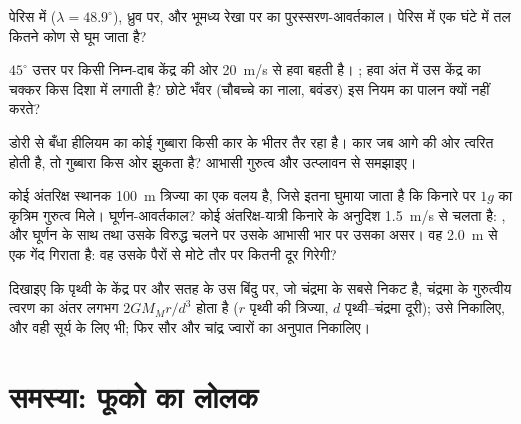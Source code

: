 \begin{exercise}[$\star\star$]\label{exo:b1:non-inertial-frames:8}
पेरिस में ($\lambda = 48.9^\circ$), ध्रुव पर, और भूमध्य रेखा पर 
का पुरस्सरण-आवर्तकाल। पेरिस में एक घंटे में तल कितने कोण से घूम जाता है?
\end{exercise}

\begin{exercise}[$\star\star$]\label{exo:b1:non-inertial-frames:9}
$45^\circ$ उत्तर पर किसी निम्न-दाब केंद्र की ओर \qty{20}{m/s} से हवा बहती
है। ; हवा अंत में उस केंद्र का चक्कर किस दिशा में लगाती है?
छोटे भँवर (चौबच्चे का नाला, बवंडर) इस नियम का पालन क्यों नहीं करते?
\end{exercise}

\begin{exercise}[$\star\star\star$]\label{exo:b1:non-inertial-frames:10}
डोरी से बँधा हीलियम का कोई गुब्बारा किसी कार के भीतर तैर रहा है। कार जब
आगे की ओर त्वरित होती है, तो गुब्बारा किस ओर झुकता है? आभासी गुरुत्व और
उत्प्लावन से समझाइए।
\end{exercise}

\begin{exercise}[$\star\star\star$]\label{exo:b1:non-inertial-frames:11}
कोई अंतरिक्ष स्थानक \qty{100}{m} त्रिज्या का एक वलय है, जिसे इतना घुमाया
जाता है कि किनारे पर $1g$ का कृत्रिम गुरुत्व मिले। घूर्णन-आवर्तकाल? कोई
अंतरिक्ष-यात्री किनारे के अनुदिश \qty{1.5}{m/s} से चलता है: , और घूर्णन के साथ तथा उसके विरुद्ध चलने पर उसके आभासी भार पर उसका
असर। वह \qty{2.0}{m} से एक गेंद गिराता है: वह उसके पैरों से मोटे तौर पर
कितनी दूर गिरेगी?
\end{exercise}

\begin{exercise}[$\star\star\star$]\label{exo:b1:non-inertial-frames:12}
दिखाइए कि पृथ्वी के केंद्र पर और सतह के उस बिंदु पर, जो चंद्रमा के सबसे
निकट है, चंद्रमा के गुरुत्वीय त्वरण का अंतर लगभग
$2GM_Mr/d^3$ होता है ($r$ पृथ्वी की त्रिज्या, $d$ पृथ्वी--चंद्रमा दूरी);
उसे निकालिए, और वही सूर्य के लिए भी; फिर सौर और चांद्र ज्वारों का अनुपात
निकालिए।
\end{exercise}

\section{समस्या: फूको का लोलक}

